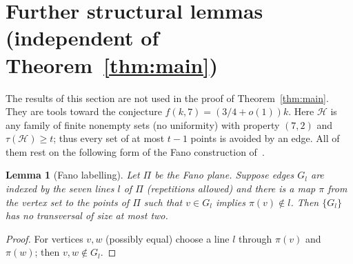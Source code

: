 \documentclass[11pt]{amsart}
\newtheorem{lemma}[theorem]{Lemma}
\theoremstyle{definition}
\theoremstyle{remark}
\newcommand{\cH}{\mathcal H}
\begin{document}
\section{Further structural lemmas (independent of Theorem~\ref{thm:main})}\label{sec:further}

The results of this section are not used in the proof of Theorem~\ref{thm:main}. They are tools toward the conjecture $f(k,7)=(3/4+o(1))k$. Here $\cH$ is any family of finite nonempty sets (no uniformity) with property $(7,2)$ and $\tau(\cH)\ge t$; thus every set of at most $t-1$ points is avoided by an edge. All of them rest on the following form of the Fano construction of~\cite{FKW}.

\begin{lemma}[Fano labelling]\label{lem:fano}
Let $\Pi$ be the Fano plane. Suppose edges $G_l$ are indexed by the seven lines $l$ of $\Pi$ (repetitions allowed) and there is a map $\pi$ from the vertex set to the points of $\Pi$ such that $v\in G_l$ implies $\pi(v)\notin l$. Then $\{G_l\}$ has no transversal of size at most two.
\end{lemma}
\begin{proof}
For vertices $v,w$ (possibly equal) choose a line $l$ through $\pi(v)$ and $\pi(w)$; then $v,w\notin G_l$.
\end{proof}
\end{document}
